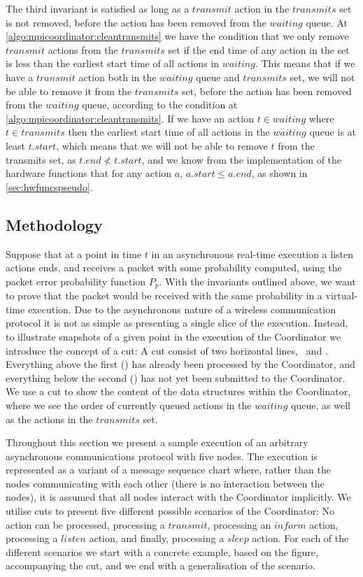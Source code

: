 The third invariant is satisfied as long as a $transmit$ action in the $transmits$ set is not removed, before the action has been removed from the $waiting$ queue. At \autoref{algo:mpicoordinator:cleantransmits} we have the condition that we only remove $transmit$ actions from the $transmits$ set if the end time of any action in the set is less than the earliest start time of all actions in $waiting$. This means that if we have a $transmit$ action both in the $waiting$ queue and $transmits$ set, we will not be able to remove it from the $transmits$ set, before the action has been removed from the $waiting$ queue, according to the condition at \autoref{algo:mpicoordinator:cleantransmits}. If we have an action $t \in waiting$ where $t \in transmits$ then the earliest start time of all actions in the $waiting$ queue is at least $t.start$, which means that we will not be able to remove $t$ from the transmits set, as $t.end \nless t.start$, and we know from the implementation of the hardware functions that for any action $a$, $a.start \leq a.end$, as shown in \autoref{sec:hwfuncspseudo}.

\subsection{Methodology}\label{sec:correctnessmethods}
Suppose that at a point in time $t$ in an asynchronous real-time execution a listen actions ends, and receives a packet with some probability computed, using the packet error probability function $P_p$. With the invariants outlined above, we want to prove that the packet would be received with the same probability in a virtual-time execution. Due to the asynchronous nature of a wireless communication protocol it is not as simple as presenting a single slice of the execution. Instead, to illustrate snapshots of a given point in the execution of the Coordinator we introduce the concept of a cut: A cut consist of two horizontal lines, \ProcessedLine\ and \SubmittedLine. Everything above the first (\ProcessedLine) has already been processed by the Coordinator, and everything below the second (\SubmittedLine) has not yet been submitted to the Coordinator. We use a cut to show the content of the data structures within the Coordinator, where we see the order of currently queued actions in the $waiting$ queue, as well as the actions in the $transmits$ set. \medbreak

Throughout this section we present a sample execution of an arbitrary asynchronous communications protocol with five nodes. The execution is represented as a variant of a message sequence chart where, rather than the nodes communicating with each other (there is no interaction between the nodes), it is assumed that all nodes interact with the Coordinator implicitly. We utilise cuts to present five different possible scenarios of the Coordinator: No action can be processed, processing a $transmit$, processing an $inform$ action, processing a $listen$ action, and finally, processing a $sleep$ action. For each of the different scenarios we start with a concrete example, based on the figure, accompanying the cut, and we end with a generalisation of the scenario.

